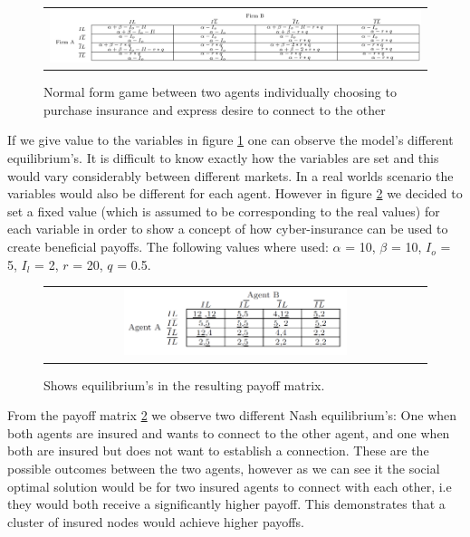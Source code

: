  
\begin{figure}[h]
\centering
\begin{tabular}{@{}c@{}}
\includegraphics[width=1.0\textwidth]{../Figures/gameTheoryModel1WithEquations.png}
\end{tabular}
\caption[Caption for LOF]{\label{fig:GTmodel1equations} Normal form game between two agents individually choosing to purchase insurance and express desire to connect to the other  \footnotemark }
\end{figure}

If we give value to the variables in figure \ref{fig:GTmodel1equations} one can observe the model's different equilibrium's. It is difficult to know exactly how the variables are set and this would vary considerably between different markets. In a real worlds scenario the variables would also be different for each agent. However in figure \ref{fig:GTmodel1} we decided to set a fixed value (which is assumed to be corresponding to the real values) for each variable in order to show a concept of how cyber-insurance can be used to create beneficial payoffs.
The following values where used: $\alpha$ = 10, $\beta$ = 10, $I_{o}$ = 5, $I_{l}$ = 2, $r$  = 20, $q$ = 0.5.


\begin{figure}[h]
\centering
\begin{tabular}{@{}c@{}}
\includegraphics[width=0.6\textwidth]{../Figures/gameTheoryModel1WithNumbers.png}
\end{tabular}
\caption{\label{fig:GTmodel1} Shows equilibrium's in the resulting payoff matrix.}
\end{figure}

From the payoff matrix \ref{fig:GTmodel1} we observe two different Nash equilibrium's: One when both agents are insured and wants to connect to the other agent, and one when both are insured but does not want to establish a connection. These are the possible outcomes between the two agents, however as we can see it the social optimal solution would be for two insured agents to connect with each other, i.e they would both receive a significantly higher payoff. This demonstrates that a cluster of insured nodes would achieve higher payoffs.  

